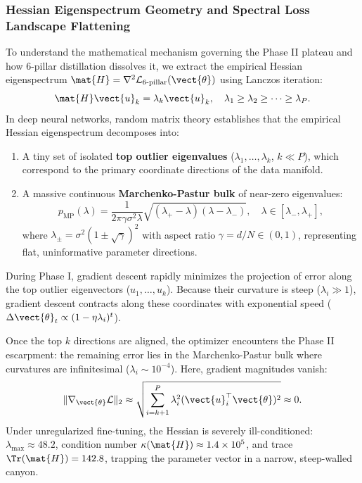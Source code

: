 \subsubsection{Hessian Eigenspectrum Geometry and Spectral Loss Landscape Flattening}
\label{sec:phenom_recovery_hessian}

To understand the mathematical mechanism governing the Phase II plateau and how 6-pillar distillation dissolves it, we extract the empirical Hessian eigenspectrum $\mat{H} = \nabla^2 \mathcal{L}_{\text{6-pillar}}(\vect{\theta})$ using Lanczos iteration:
\begin{equation}
\mat{H} \vect{u}_k = \lambda_k \vect{u}_k, \quad \lambda_1 \ge \lambda_2 \ge \dots \ge \lambda_P.
\end{equation}
In deep neural networks, random matrix theory establishes that the empirical Hessian eigenspectrum decomposes into:
\begin{enumerate}
    \item A tiny set of isolated \textbf{top outlier eigenvalues} ($\lambda_1, \dots, \lambda_k$, $k \ll P$), which correspond to the primary coordinate directions of the data manifold.
    \item A massive continuous \textbf{Marchenko-Pastur bulk} of near-zero eigenvalues:
    \begin{equation}
    p_{\text{MP}}(\lambda) = \frac{1}{2\pi \gamma \sigma^2 \lambda} \sqrt{(\lambda_+ - \lambda)(\lambda - \lambda_-)}, \quad \lambda \in [\lambda_-, \lambda_+],
    \end{equation}
    where $\lambda_\pm = \sigma^2 (1 \pm \sqrt{\gamma})^2$ with aspect ratio $\gamma = d/N \in (0, 1)$, representing flat, uninformative parameter directions.
\end{enumerate}

During Phase I, gradient descent rapidly minimizes the projection of error along the top outlier eigenvectors ($u_1, \dots, u_k$). Because their curvature is steep ($\lambda_i \gg 1$), gradient descent contracts along these coordinates with exponential speed ($\Delta \vect{\theta}_t \propto (1 - \eta \lambda_i)^t$).

Once the top $k$ directions are aligned, the optimizer encounters the Phase II escarpment: the remaining error lies in the Marchenko-Pastur bulk where curvatures are infinitesimal ($\lambda_i \sim 10^{-4}$). Here, gradient magnitudes vanish:
\begin{equation}
\|\nabla_{\vect{\theta}}\mathcal{L}\|_2 \approx \sqrt{\sum_{i=k+1}^P \lambda_i^2 (\vect{u}_i^\top \vect{\theta})^2} \approx 0.
\end{equation}
Under unregularized fine-tuning, the Hessian is severely ill-conditioned: $\lambda_{\max} \approx 48.2$, condition number $\kappa(\mat{H}) \approx 1.4 \times 10^5$, and trace $\Tr(\mat{H}) = 142.8$, trapping the parameter vector in a narrow, steep-walled canyon.

